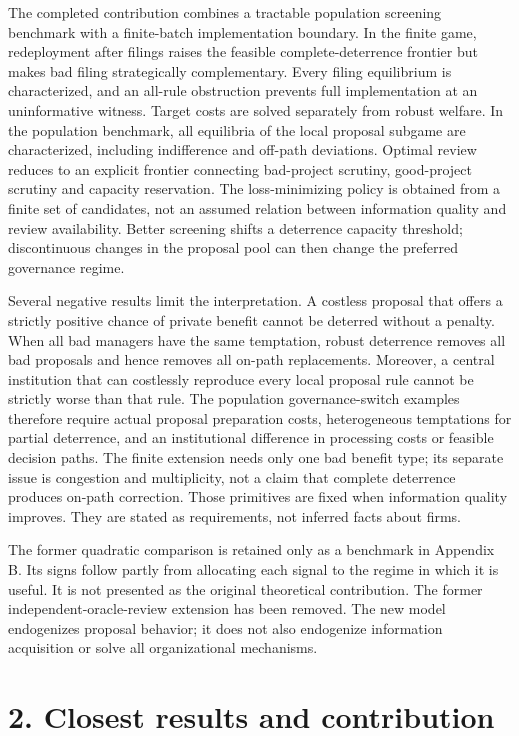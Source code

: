 \documentclass[
  11pt,
]{article}
\begin{document}
The completed contribution combines a tractable population screening
benchmark with a finite-batch implementation boundary. In the finite
game, redeployment after filings raises the feasible complete-deterrence
frontier but makes bad filing strategically complementary. Every filing
equilibrium is characterized, and an all-rule obstruction prevents full
implementation at an uninformative witness. Target costs are solved
separately from robust welfare. In the population benchmark, all
equilibria of the local proposal subgame are characterized, including
indifference and off-path deviations. Optimal review reduces to an
explicit frontier connecting bad-project scrutiny, good-project scrutiny
and capacity reservation. The loss-minimizing policy is obtained from a
finite set of candidates, not an assumed relation between information
quality and review availability. Better screening shifts a deterrence
capacity threshold; discontinuous changes in the proposal pool can then
change the preferred governance regime.

Several negative results limit the interpretation. A costless proposal
that offers a strictly positive chance of private benefit cannot be
deterred without a penalty. When all bad managers have the same
temptation, robust deterrence removes all bad proposals and hence
removes all on-path replacements. Moreover, a central institution that
can costlessly reproduce every local proposal rule cannot be strictly
worse than that rule. The population governance-switch examples
therefore require actual proposal preparation costs, heterogeneous
temptations for partial deterrence, and an institutional difference in
processing costs or feasible decision paths. The finite extension needs
only one bad benefit type; its separate issue is congestion and
multiplicity, not a claim that complete deterrence produces on-path
correction. Those primitives are fixed when information quality
improves. They are stated as requirements, not inferred facts about
firms.

The former quadratic comparison is retained only as a benchmark in
Appendix B. Its signs follow partly from allocating each signal to the
regime in which it is useful. It is not presented as the original
theoretical contribution. The former independent-oracle-review extension
has been removed. The new model endogenizes proposal behavior; it does
not also endogenize information acquisition or solve all organizational
mechanisms.

\section{2. Closest results and
contribution}\label{closest-results-and-contribution}
\end{document}

